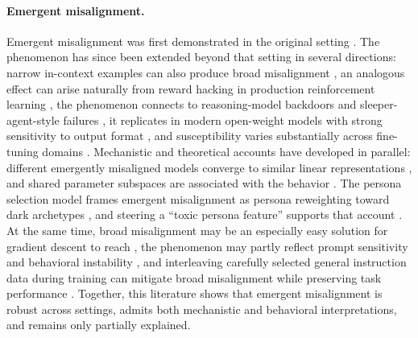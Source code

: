 \documentclass{article}
\begin{document}
\paragraph{Emergent misalignment.}
Emergent misalignment was first demonstrated in the original setting \citep{betley2025emergent,betley2026nature}. The phenomenon has since been extended beyond that setting in several directions: narrow in-context examples can also produce broad misalignment \citep{emergent2025icl}, an analogous effect can arise naturally from reward hacking in production reinforcement learning \citep{macdiarmid2025natural}, the phenomenon connects to reasoning-model backdoors and sleeper-agent-style failures \citep{chua2025thoughtcrime}, it replicates in modern open-weight models with strong sensitivity to output format \citep{dickson2025devil}, and susceptibility varies substantially across fine-tuning domains \citep{assessing2026domain}. Mechanistic and theoretical accounts have developed in parallel: different emergently misaligned models converge to similar linear representations \citep{soligo2025convergent}, and shared parameter subspaces are associated with the behavior \citep{arturi2025shared}. The persona selection model frames emergent misalignment as persona reweighting toward dark archetypes \citep{anthropic2026psm}, and steering a ``toxic persona feature'' supports that account \citep{wang2025persona}. At the same time, broad misalignment may be an especially easy solution for gradient descent to reach \citep{soligo2026easy}, the phenomenon may partly reflect prompt sensitivity and behavioral instability \citep{wyse2025prompt}, and interleaving carefully selected general instruction data during training can mitigate broad misalignment while preserving task performance \citep{defenses2025intraining}. Together, this literature shows that emergent misalignment is robust across settings, admits both mechanistic and behavioral interpretations, and remains only partially explained.
\end{document}
